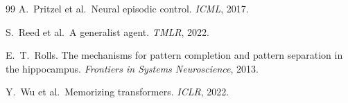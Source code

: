 \documentclass[10pt,letterpaper]{article}
\begin{document}
\begin{thebibliography}{99}
A.~Pritzel et al.\ \newblock Neural episodic control. \emph{ICML}, 2017.

S.~Reed et al.\ \newblock A generalist agent. \emph{TMLR}, 2022.

E.~T.~Rolls. \newblock The mechanisms for pattern completion and pattern separation in the hippocampus. \emph{Frontiers in Systems Neuroscience}, 2013.

Y.~Wu et al.\ \newblock Memorizing transformers. \emph{ICLR}, 2022.

\end{thebibliography}
\end{document}
